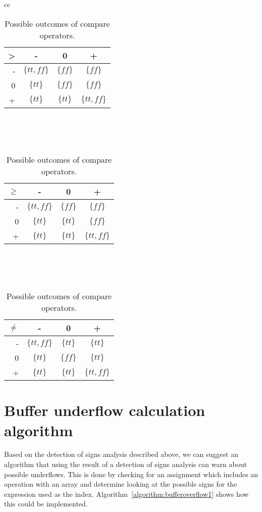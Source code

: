 \begin{table}
\begin{tabular}{cc}
    \begin{minipage}{0.4\linewidth}
		\begin{tabular}{| r | c | c | c |}
		\hline
		 >   & -   & 0 & +  \\
		\hline
		 -  & $\{tt,ff\}$ & $\{ff\}$ & $\{ff\}$  \\
		\hline
		 0  & $\{tt\}$ & $\{ff\}$ & $\{ff\}$ \\
		\hline
		 +  & $\{tt\}$ & $\{tt\}$ & $\{tt,ff\}$ \\
		 \hline
		\end{tabular}
		\\\\\\
		\begin{tabular}{| r | c | c | c |}
		\hline
		 $\geq$   & -   & 0 & +  \\
		\hline
		 -  & $\{tt,ff\}$ & $\{ff\}$ & $\{ff\}$  \\
		\hline
		 0  & $\{tt\}$ & $\{tt\}$ & $\{ff\}$ \\
		\hline
		 +  & $\{tt\}$ & $\{tt\}$ & $\{tt,ff\}$ \\
		 \hline
		\end{tabular}
		\\\\\\
		\begin{tabular}{| r | c | c | c |}
		\hline
		 $\neq$   & -   & 0 & +  \\
		\hline
		 -  & $\{tt,ff\}$ & $\{tt\}$ & $\{tt\}$  \\
		\hline
		 0  & $\{tt\}$ & $\{ff\}$ & $\{tt\}$ \\
		\hline
		 +  & $\{tt\}$ & $\{tt\}$ & $\{tt,ff\}$ \\
		 \hline
		\end{tabular}
    \end{minipage}
\end{tabular}
\centering
\caption{Possible outcomes of compare operators.}
\label{table:boolean_operator}
\end{table}


\section{Buffer underflow calculation algorithm}
Based on the detection of signs analysis described above, we can suggest an algorithm that using the result of a detection of signs analysis can warn about possible underflows. This is done by checking for an assignment which includes an operation with an array and determine looking at the possible signs for the expression used as the index. Algorithm~\ref{algorithm:bufferoverflow1} shows how this could be implemented.


